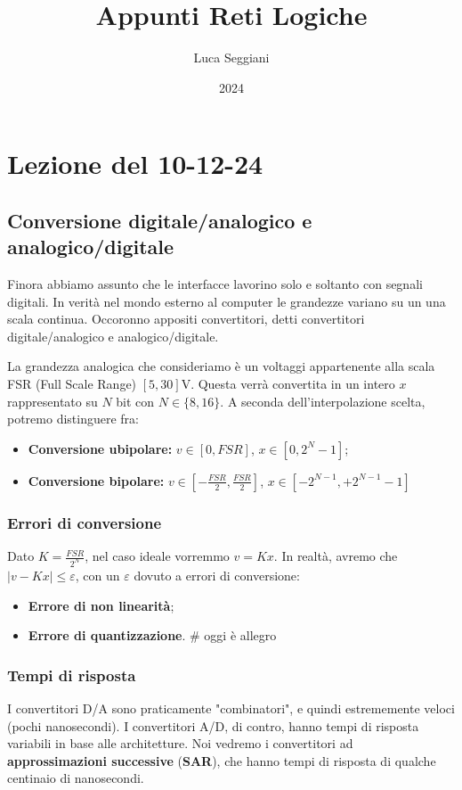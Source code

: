 \documentclass[a4paper,11pt]{article}
\title{Appunti Reti Logiche}
\author{Luca Seggiani}
\date{2024}
\begin{document}
\section{Lezione del 10-12-24}

\thispagestyle{empty}
\pagestyle{fancy}

\subsection{Conversione digitale/analogico e analogico/digitale}
Finora abbiamo assunto che le interfacce lavorino solo e soltanto con segnali digitali.
In verità nel mondo esterno al computer le grandezze variano su un una scala continua.
Occoronno appositi convertitori, detti convertitori digitale/analogico e analogico/digitale.


La grandezza analogica che consideriamo è un voltaggi appartenente alla scala FSR (Full Scale Range) $[5, 30] \mathrm{V}$.
Questa verrà convertita in un intero $x$ rappresentato su $N$ bit con $N \in \{8, 16\}$.
A seconda dell'interpolazione scelta, potremo distinguere fra:
\begin{itemize}
	\item \textbf{Conversione ubipolare:} $v \in [0, FSR]$, $x \in [0, 2^N -1]$;
	\item \textbf{Conversione bipolare:} $v \in \left[ -\frac{FSR}{2}, \frac{FSR}{2} \right]$, $x \in \left[ -2^{N-1}, +2^{N-1} -1 \right]$
\end{itemize}

\subsubsection{Errori di conversione}
Dato $K = \frac{FSR}{2^N}$, nel caso ideale vorremmo $v = Kx$.
In realtà, avremo che $|v - Kx| \leq \varepsilon$, con un $\varepsilon$ dovuto a errori di conversione:
\begin{itemize}
	\item \textbf{Errore di non linearità};
	\item \textbf{Errore di quantizzazione}. # oggi è allegro
\end{itemize}

\subsubsection{Tempi di risposta}
I convertitori D/A sono praticamente "combinatori", e quindi estrememente veloci (pochi nanosecondi).
I convertitori A/D, di contro, hanno tempi di risposta variabili in base alle architetture.
Noi vedremo i convertitori ad \textbf{approssimazioni successive} (\textbf{SAR}), che hanno tempi di risposta di qualche centinaio di nanosecondi.
\end{document}
